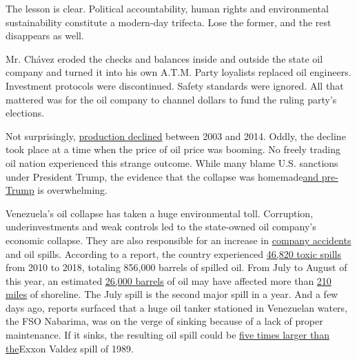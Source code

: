 The lesson is clear. Political accountability, human rights and
environmental sustainability constitute a modern-day trifecta. Lose the
former, and the rest disappears as well.

Mr. Chávez eroded the checks and balances inside and outside the state
oil company and turned it into his own A.T.M. Party loyalists replaced
oil engineers. Investment protocols were discontinued. Safety standards
were ignored. All that mattered was for the oil company to channel
dollars to fund the ruling party's elections.

Not surprisingly,
\href{https://www.researchgate.net/publication/341117583_Oil_and_regime_type_in_Latin_America_Reversing_the_line_of_causality}{production
declined} between 2003 and 2014. Oddly, the decline took place at a time
when the price of oil price was booming. No freely trading oil nation
experienced this strange outcome. While many blame U.S. sanctions under
President Trump, the evidence that the collapse was
homemade\href{https://growthlab.cid.harvard.edu/publications/venezuelan-oil-assessment}{and
pre-Trump} is overwhelming.

Venezuela's oil collapse has taken a huge environmental toll.
Corruption, underinvestments and weak controls led to the state-owned
oil company's economic collapse. They are also responsible for an
increase in \href{https://venezuelanalysis.com/analysis/14984}{company
accidents} and oil spills. According to a report, the country
experienced
\href{https://www.derechos.org.ve/actualidad/en-seis-anos-pdvsa-derramo-856-72285-barriles-de-petroleo-al-medio-ambiente}{46,820
toxic spills} from 2010 to 2018, totaling 856,000 barrels of spilled
oil. From July to August of this year, an estimated
\href{https://www.forbes.com/sites/nishandegnarain/2020/08/28/oil-spill-august-what-the-major-oil-spills-in-venezuela-and-mauritius-mean-for-the-world/\#68dd06bd59bd}{26,000
barrels} of oil may have affected more than
\href{http://www.petroleumworld.com/storyt20082001.htm}{210 miles} of
shoreline. The July spill is the second major spill in a year. And a few
days ago, reports surfaced that a huge oil tanker stationed in
Venezuelan waters, the FSO Nabarima, was on the verge of sinking because
of a lack of proper maintenance. If it sinks, the resulting oil spill
could be
\href{https://www.nytimes3xbfgragh.onion/aponline/2020/09/02/world/americas/ap-lt-venezuela-sinking-oil-tanker.html\#:~:text=CARACAS\%2C\%20Venezuela\%20\%E2\%80\%94\%20The\%20sight\%20of,a\%20dangerous\%20state\%20of\%20disrepair.}{five
times larger than the}Exxon Valdez spill of 1989.

